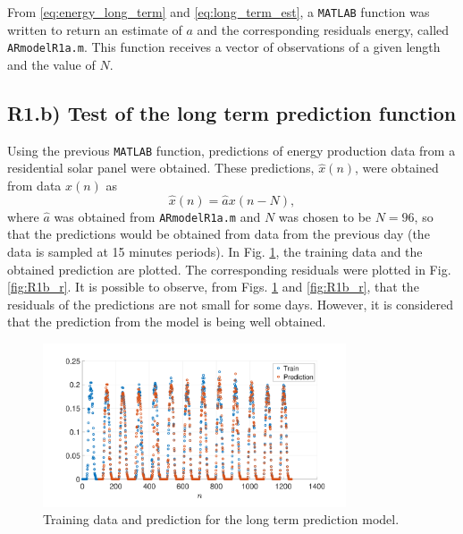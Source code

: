 \documentclass[a4paper, oneside, 11pt]{article}
\begin{document}
From \eqref{eq:energy_long_term} and \eqref{eq:long_term_est}, a \texttt{MATLAB}{\texttrademark} function was written to return an estimate of $a$ and the corresponding residuals energy, called \texttt{ARmodelR1a.m}. This function receives a vector of observations of a given length and the value of $N$.

\subsection{R1.b) Test of the long term prediction function}

Using the previous \texttt{MATLAB}{\texttrademark} function, predictions of energy production data from a residential solar panel were obtained. These predictions, $\hat{x}(n)$, were obtained from data $x(n)$ as
\begin{equation}
    \hat{x}(n) = \hat{a} x(n-N),
\end{equation}
where $\hat{a}$ was obtained from \texttt{ARmodelR1a.m} and $N$ was chosen to be $N=96$, so that the predictions would be obtained from data from the previous day (the data is sampled at 15 minutes periods). In Fig. \ref{fig:R1b_x}, the training data and the obtained prediction are plotted. The corresponding residuals were plotted in Fig. \ref{fig:R1b_r}. It is possible to observe, from Figs. \ref{fig:R1b_x} and \ref{fig:R1b_r}, that the residuals of the predictions are not small for some days. However, it is considered that the prediction from the model is being well obtained.

\begin{figure}[ht]
    \centering
    \includegraphics[width=0.8\textwidth]{figures/long_term_pred.pdf}
    \caption{Training data and prediction for the long term prediction model.}
    \label{fig:R1b_x}
\end{figure}
\end{document}
